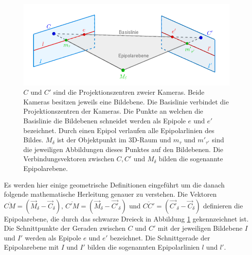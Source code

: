 \begin{figure}[!htb]
	\centering
	\includegraphics[width=.8\linewidth]{images/EpipolarGeoemtrieGrafik_beschriftet.png}
	\caption[Epipolar Geometrie]{$C$ und $C'$ sind die Projektionszentren zweier Kameras. Beide Kameras besitzen jeweils eine Bildebene. Die Basislinie verbindet die Projektionszentren der Kameras. Die Punkte an welchen die Basislinie die Bildebenen schneidet werden als Epipole $e$ und $e'$ bezeichnet. Durch einen Epipol verlaufen alle Epipolarlinien des Bildes. $M_\delta$ ist der Objektpunkt im 3D-Raum und $m_\tau$ und $m'_{\tau'}$ sind die jeweiligen Abbildungen dieses Punktes auf den Bildebenen. Die Verbindungsvektoren zwischen $C, C'$ und $M_\delta$ bilden die sogenannte Epipolarebene\cite{Hoffmann,phdTwoView,HZ,ZZGXr}.}  
	\label{fig:Epipolargeometry}
\end{figure}



Es werden hier einige geometrische Definitionen eingeführt um die danach folgende mathematische Herleitung genauer zu verstehen. Die Vektoren $\overline{CM} = (\vec{M}_\delta - \vec{C}_\delta),\, \overline{C'M} = (\vec{M}_\delta - \vec{C'}_\delta)$ und $\overline{CC'} = (\vec{C'}_\delta - \vec{C}_\delta)$ definieren die Epipolarebene, die durch das schwarze Dreieck in Abbildung \ref{fig:Epipolargeometry} gekennzeichnet ist. Die Schnittpunkte der Geraden zwischen $C$ und $C'$ mit der jeweiligen Bildebene $I$ und $I'$ werden als Epipole $e$ und $e'$ bezeichnet. Die Schnittgerade der Epipolarebene mit $I$ und $I'$ bilden die sogenannten Epipolarlinien $l$ und $l'$\cite{HZ,Zhang2014,ZZPaper,phdTwoView}.\\%

